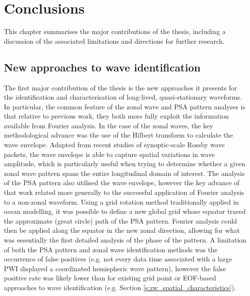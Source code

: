 
\chapter{Conclusions}\label{c:conclusions}


\begin{synopsis}
This chapter summarises the major contributions of the thesis, including a discussion of the associated limitations and directions for further research.
\end{synopsis}


\section{New approaches to wave identification}

The first major contribution of the thesis is the new approaches it presents for the identification and characterisation of long-lived, quasi-stationary waveforms. In particular, the common feature of the zonal wave and PSA pattern analyses is that relative to previous work, they both more fully exploit the information available from Fourier analysis. In the case of the zonal waves, the key methodological advance was the use of the Hilbert transform to calculate the wave envelope. Adapted from recent studies of synoptic-scale Rossby wave packets, the wave envelope is able to capture spatial variations in wave amplitude, which is particularly useful when trying to determine whether a given zonal wave pattern spans the entire longitudinal domain of interest. The analysis of the PSA pattern also utilised the wave envelope, however the key advance of that work related more generally to the successful application of Fourier analysis to a non-zonal waveform. Using a grid rotation method traditionally applied in ocean modelling, it was possible to define a new global grid whose equator traced the approximate (great circle) path of the PSA pattern. Fourier analysis could then be applied along the equator in the new zonal direction, allowing for what was essentially the first detailed analysis of the phase of the pattern. A limitation of both the PSA pattern and zonal wave identification methods was the occurrence of false positives (e.g. not every data time associated with a large PWI displayed a coordinated hemispheric wave pattern), however the false positive rate was likely lower than for existing grid point or EOF-based approaches to wave identification (e.g. Section \ref{s:zw_spatial_characteristics}).

